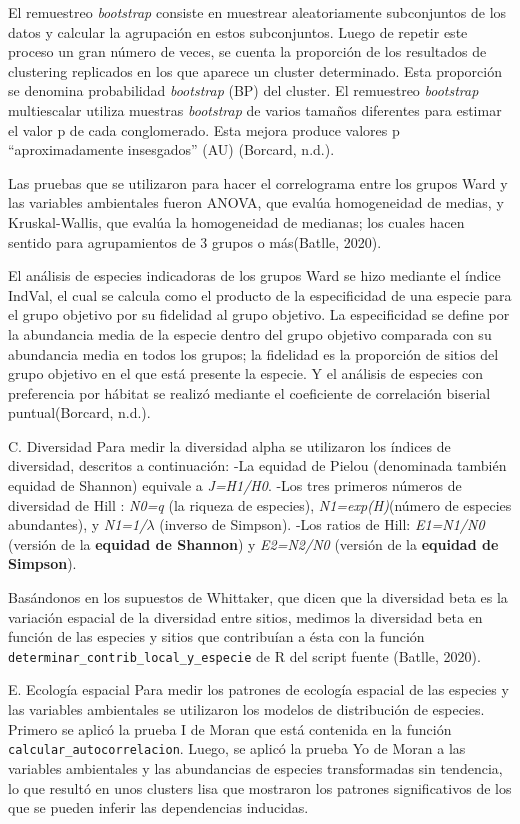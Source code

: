 \documentclass[11pt,]{article}
\begin{document}
El remuestreo \emph{bootstrap} consiste en muestrear aleatoriamente
subconjuntos de los datos y calcular la agrupación en estos
subconjuntos. Luego de repetir este proceso un gran número de veces, se
cuenta la proporción de los resultados de clustering replicados en los
que aparece un cluster determinado. Esta proporción se denomina
probabilidad \emph{bootstrap} (BP) del cluster. El remuestreo
\emph{bootstrap} multiescalar utiliza muestras \emph{bootstrap} de
varios tamaños diferentes para estimar el valor p de cada conglomerado.
Esta mejora produce valores p ``aproximadamente insesgados'' (AU)
(Borcard, n.d.).

Las pruebas que se utilizaron para hacer el correlograma entre los
grupos Ward y las variables ambientales fueron ANOVA, que evalúa
homogeneidad de medias, y Kruskal-Wallis, que evalúa la homogeneidad de
medianas; los cuales hacen sentido para agrupamientos de 3 grupos o
más(Batlle, 2020).

El análisis de especies indicadoras de los grupos Ward se hizo mediante
el índice IndVal, el cual se calcula como el producto de la
especificidad de una especie para el grupo objetivo por su fidelidad al
grupo objetivo. La especificidad se define por la abundancia media de la
especie dentro del grupo objetivo comparada con su abundancia media en
todos los grupos; la fidelidad es la proporción de sitios del grupo
objetivo en el que está presente la especie. Y el análisis de especies
con preferencia por hábitat se realizó mediante el coeficiente de
correlación biserial puntual(Borcard, n.d.).

C. Diversidad Para medir la diversidad alpha se utilizaron los índices
de diversidad, descritos a continuación: -La equidad de Pielou
(denominada también equidad de Shannon) equivale a \emph{J=H1/H0}. -Los
tres primeros números de diversidad de Hill : \emph{N0=q} (la riqueza de
especies), \emph{N1=exp(H)}(número de especies abundantes), y
\emph{N1=1/\(\lambda\)} (inverso de Simpson). -Los ratios de Hill:
\emph{E1=N1/N0} (versión de la \textbf{equidad de Shannon}) y
\emph{E2=N2/N0} (versión de la \textbf{equidad de Simpson}).

Basándonos en los supuestos de Whittaker, que dicen que la diversidad
beta es la variación espacial de la diversidad entre sitios, medimos la
diversidad beta en función de las especies y sitios que contribuían a
ésta con la función \texttt{determinar\_contrib\_local\_y\_especie} de R
del script fuente (Batlle, 2020).

E. Ecología espacial Para medir los patrones de ecología espacial de las
especies y las variables ambientales se utilizaron los modelos de
distribución de especies. Primero se aplicó la prueba I de Moran que
está contenida en la función \texttt{calcular\_autocorrelacion}. Luego,
se aplicó la prueba Yo de Moran a las variables ambientales y las
abundancias de especies transformadas sin tendencia, lo que resultó en
unos clusters lisa que mostraron los patrones significativos de los que
se pueden inferir las dependencias inducidas.
\end{document}
